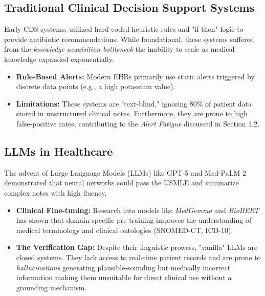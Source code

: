 \subsection{Traditional Clinical Decision Support Systems} Early CDS systems, utilized hard-coded heuristic rules and "if-then" logic to provide antibiotic recommendations. While foundational, these systems suffered from the \textit{knowledge acquisition bottleneck} the inability to scale as medical knowledge expanded exponentially. \begin{itemize} \item \textbf{Rule-Based Alerts:} Modern EHRs primarily use static alerts triggered by discrete data points (e.g., a high potassium value). \item \textbf{Limitations:} These systems are "text-blind," ignoring 80\% of patient data stored in unstructured clinical notes. Furthermore, they are prone to high false-positive rates, contributing to the \textit{Alert Fatigue} discussed in Section 1.2. \end{itemize}

\subsection{LLMs in Healthcare} The advent of Large Language Models (LLMs) like GPT-5 and Med-PaLM 2 demonstrated that neural networks could pass the USMLE and summarize complex notes with high fluency. \begin{itemize} \item \textbf{Clinical Fine-tuning:} Research into models like \textit{MedGemma} and \textit{BioBERT} has shown that domain-specific pre-training improves the understanding of medical terminology and clinical ontologies (SNOMED-CT, ICD-10). \item \textbf{The Verification Gap:} Despite their linguistic prowess, "vanilla" LLMs are closed systems. They lack access to real-time patient records and are prone to \textit{hallucinations} generating plausible-sounding but medically incorrect information making them unsuitable for direct clinical use without a grounding mechanism. \end{itemize}

